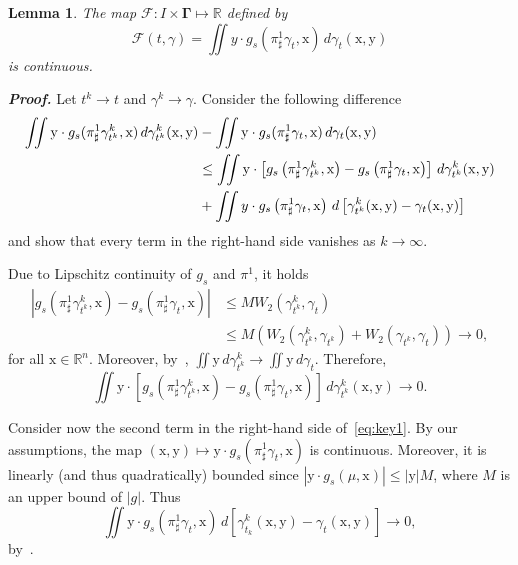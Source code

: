 \documentclass[sn-mathphys-num]{sn-jnl}
\numberwithin{equation}{section}
\theoremstyle{mythm}
\newtheorem{lemma}[proposition]{Lemma}
\theoremstyle{mydef}
\renewenvironment{proof}{\smallskip\noindent\emph{\textbf{Proof.}}%
  \hspace{1pt}}{\hspace{-5pt}{\nobreak\quad\nobreak\hfill\nobreak%
    $\square$\vspace{2pt}\par}\smallskip\goodbreak}
\renewcommand{\d}{\,d}
\begin{document}
 \begin{lemma}
   \label{lem:rhs}
   The map \( \mathcal{F}\colon I \times \bm \Gamma \mapsto \mathbb{R} \) defined by
   \[
     \mathcal{F}(t,\gamma) = \iint y\cdot g_s(\pi^1_{\sharp}\gamma_t,\mathrm{x})\d \gamma_t(\mathrm{x},\mathrm{y})
   \]
   is continuous.
 \end{lemma}
 \begin{proof}
   Let \( t^k\to t \) and \( \gamma^k\to \gamma \).
  Consider the following difference
  \begin{align}
    \iint \mathrm{y}\cdot g_s(\pi^1_{\sharp}\gamma^k_{t^k},\mathrm{x})\d \gamma^k_{t^k}(\mathrm{x},\mathrm{y}) &-
    \iint \mathrm{y}\cdot g_s(\pi^1_{\sharp}\gamma_t,\mathrm{x})\d \gamma_{t}(\mathrm{x},\mathrm{y})\notag\\
    &\le
    \iint \mathrm{y}\cdot \left[g_s\left(\pi^1_{\sharp}\gamma^k_{t^k},\mathrm{x}\right)-g_s\left(\pi^1_{\sharp}\gamma_{t},\mathrm{x}\right)\right]\d \gamma^{k}_{t^k}(\mathrm{x},\mathrm{y})\notag\\
    &+
    \iint y\cdot g_s\left(\pi^1_{\sharp}\gamma_t,\mathrm{x}\right)\d \left[\gamma^k_{t^k}(\mathrm{x},\mathrm{y})-\gamma_t(\mathrm{x},\mathrm{y})\right]\label{eq:key1}
  \end{align}
  and show that every term in the right-hand side vanishes as \( k\to \infty \).

  Due to Lipschitz continuity of \( g_s \) and \( \pi^1 \), it holds
\begin{align*}
\left|g_s\left(\pi^1_{\sharp}\gamma^k_{t^k},\mathrm{x}\right)-g_s\left(\pi^1_{\sharp}\gamma_{t},\mathrm{x}\right)\right| & \leq MW_2(\gamma^k_{t^k},\gamma_t)\\
& \leq M \left( W_2(\gamma^k_{t^k},\gamma_{t^k}) + W_2(\gamma_{t^k},\gamma_t) \right)\to 0,
\end{align*}
for all \( \mathrm{x}\in \mathbb{R}^n \).
Moreover, by~\cite[Theorem 6.9]{zbMATH05306371}, \( \iint \mathrm{y}\d\gamma^k_{t^k}\to \iint \mathrm{y}\d \gamma_{t} \).
  Therefore,
  \begin{equation*}
    \iint \mathrm{y}\cdot \left[g_s\left(\pi^1_{\sharp}\gamma^k_{t^k},\mathrm{x}\right)-g_s\left(\pi^1_{\sharp}\gamma_{t},\mathrm{x}\right)\right]\d \gamma^{k}_{t^k}(\mathrm{x},\mathrm{y})\to 0.
  \end{equation*}

  Consider now the second term in the right-hand side of~\eqref{eq:key1}.
  By our assumptions, the map \( (\mathrm{x},\mathrm{y})\mapsto \mathrm{y}\cdot g_s(\pi^1_{\sharp}\gamma_t,\mathrm{x}) \) is continuous.
  Moreover, it is linearly (and thus quadratically) bounded since \( |\mathrm{y}\cdot g_s(\mu,\mathrm{x})|\le |\mathrm{y}|M \), where \( M \) is an upper bound of \( |g| \).
  Thus
  \begin{equation}
    \label{eq:key}
    \iint \mathrm{y}\cdot g_s\left(\pi^1_{\sharp}\gamma_t,\mathrm{x}\right)\d \left[\gamma^k_{t_k}(\mathrm{x},\mathrm{y})-\gamma_t(\mathrm{x},\mathrm{y})\right]\to 0,
  \end{equation}
by~\cite[Theorem 6.9]{zbMATH05306371}.
\end{proof}
\end{document}

